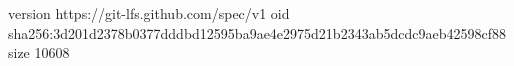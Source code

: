 version https://git-lfs.github.com/spec/v1
oid sha256:3d201d2378b0377dddbd12595ba9ae4e2975d21b2343ab5dcdc9aeb42598cf88
size 10608
